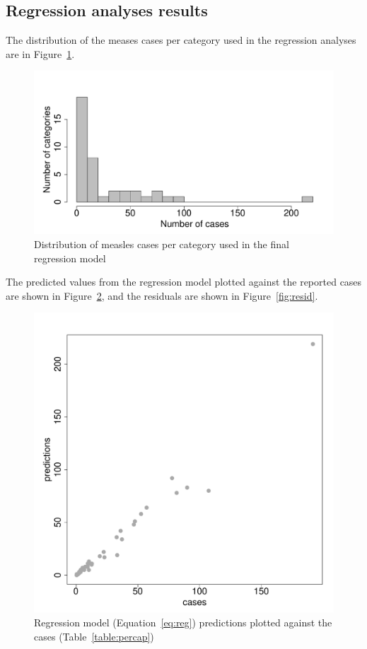 \documentclass{article}
\begin{document}
\begin{itemize}
\subsection{Regression analyses results}
\label{sub:regression_results}

The distribution of the meases cases per category used in the regression analyses are in Figure~\ref{fig:histcasecat}.
\begin{figure}
\begin{center}
\includegraphics{draftfinalreport-014}
\end{center}
\caption{Distribution of measles cases per category used in the final regression model}
\label{fig:histcasecat}
\end{figure}

The predicted values from the regression model plotted against the reported cases are shown in Figure~\ref{fig:predict}, and the residuals are shown in Figure~\ref{fig:resid}.
\begin{figure}
\begin{center}
\includegraphics{draftfinalreport-015}
\end{center}
\caption{Regression model (Equation~\ref{eq:reg}) predictions plotted against the cases (Table~\ref{table:percap})}
\label{fig:predict}
\end{figure}



\end{itemize}
\end{document}
